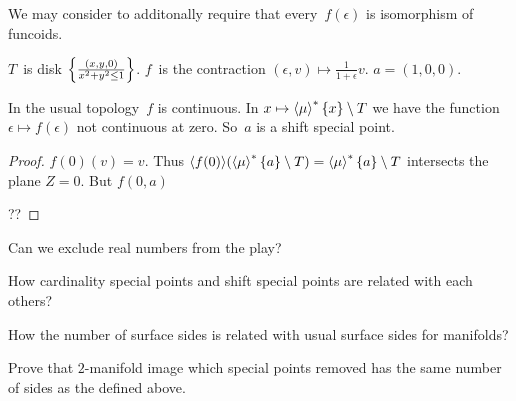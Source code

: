 We may consider to additonally require that every~$f(\epsilon)$ is isomorphism
of funcoids.

\begin{example}
$T$~is disk $\left\{ \frac{(x,y,0)}{x^2+y^2\leq 1}\right\}$. $f$~is the contraction
$(\epsilon,v)\mapsto\frac{1}{1+\epsilon}v$. $a=(1,0,0)$.

In the usual topology~$f$ is continuous. In
$x\mapsto\left\langle \mu\right\rangle ^{\ast}\{x\}\setminus T$ we have the function
$\epsilon\mapsto f(\epsilon)$ not continuous at zero.
So~$a$ is a shift special point.
\end{example}

\begin{proof}
$f (0) (v) = v$. Thus $\langle f (0) \rangle (\left\langle \mu\right\rangle ^{\ast} \{ a
\} \setminus T) = \left\langle \mu\right\rangle ^{\ast} \{ a \} \setminus T$ intersects
the plane $Z = 0$. But $f (0, a)$

??
\end{proof}

\begin{question}
Can we exclude real numbers from the play?
\end{question}

\begin{question}
How cardinality special points and shift special points are related with each
others?
\end{question}

\begin{question}
How the number of surface sides is related with usual surface sides for
manifolds?
\end{question}

Prove that $2$-manifold image which special points removed has the same number
of sides as the defined above.
